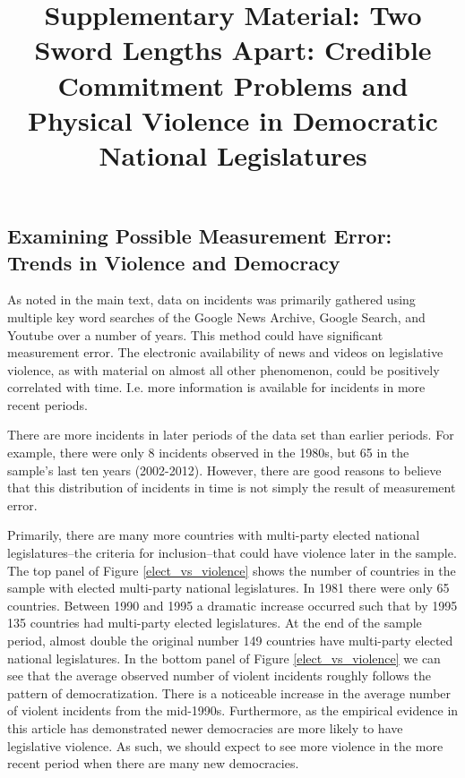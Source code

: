 \documentclass[a4paper]{article}\usepackage[]{graphicx}\usepackage[]{color}
\title{Supplementary Material: Two Sword Lengths Apart: Credible Commitment Problems and Physical Violence in Democratic National Legislatures}
\begin{document}
\maketitle






\subsection*{Examining Possible Measurement Error: Trends in Violence and Democracy}


As noted in the main text, data on incidents was primarily gathered using multiple key word searches of the Google News Archive, Google Search, and Youtube over a number of years. This method could have significant measurement error. The electronic availability of news and videos on legislative violence, as with material on almost all other phenomenon, could be positively correlated with time. I.e. more information is available for incidents in more recent periods.

There are more incidents in later periods of the data set than earlier periods. For example, there were only 8 incidents observed in the 1980s, but 65 in the sample's last ten years (2002-2012). However, there are good reasons to believe that this distribution of incidents in time is not simply the result of measurement error.

Primarily, there are many more countries with multi-party elected national legislatures--the criteria for inclusion--that could have violence later in the sample. The top panel of Figure \ref{elect_vs_violence} shows the number of countries in the sample with elected multi-party national legislatures. In 1981 there were only 65 countries. Between 1990 and 1995 a dramatic increase occurred such that by 1995 135 countries had multi-party elected legislatures. At the end of the sample period, almost double the original number 149 countries have multi-party elected national legislatures. In the bottom panel of Figure \ref{elect_vs_violence} we can see that the average observed number of violent incidents roughly follows the pattern of democratization. There is a noticeable increase in the average number of violent incidents from the mid-1990s. Furthermore, as the empirical evidence in this article has demonstrated newer democracies are more likely to have legislative violence. As such, we should expect to see more violence in the more recent period when there are many new democracies.
\end{document}
